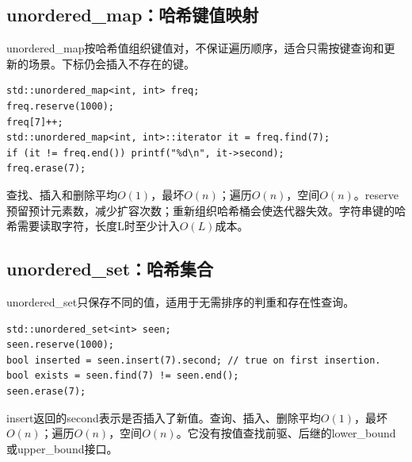 \subsection{unordered\_map：哈希键值映射}
unordered\_map按哈希值组织键值对，不保证遍历顺序，适合只需按键查询和更新的场景。下标仍会插入不存在的键。
\begin{lstlisting}
std::unordered_map<int, int> freq;
freq.reserve(1000);
freq[7]++;
std::unordered_map<int, int>::iterator it = freq.find(7);
if (it != freq.end()) printf("%d\n", it->second);
freq.erase(7);
\end{lstlisting}
查找、插入和删除平均$O(1)$，最坏$O(n)$；遍历$O(n)$，空间$O(n)$。reserve预留预计元素数，减少扩容次数；重新组织哈希桶会使迭代器失效。字符串键的哈希需要读取字符，长度L时至少计入$O(L)$成本。

\subsection{unordered\_set：哈希集合}
unordered\_set只保存不同的值，适用于无需排序的判重和存在性查询。
\begin{lstlisting}
std::unordered_set<int> seen;
seen.reserve(1000);
bool inserted = seen.insert(7).second; // true on first insertion.
bool exists = seen.find(7) != seen.end();
seen.erase(7);
\end{lstlisting}
insert返回的second表示是否插入了新值。查询、插入、删除平均$O(1)$，最坏$O(n)$；遍历$O(n)$，空间$O(n)$。它没有按值查找前驱、后继的lower\_bound或upper\_bound接口。

